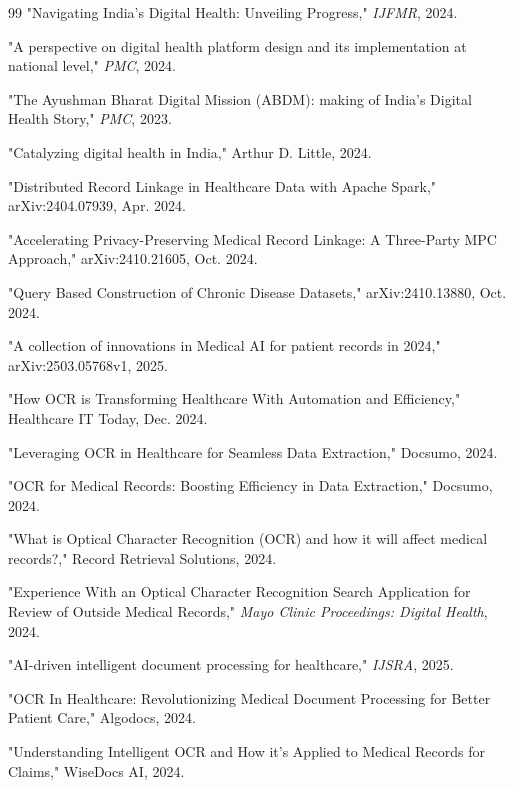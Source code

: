 \documentclass[conference]{IEEEtran}
\begin{document}
\begin{thebibliography}{99}
"Navigating India's Digital Health: Unveiling Progress," \textit{IJFMR}, 2024.

"A perspective on digital health platform design and its implementation at national level," \textit{PMC}, 2024.

"The Ayushman Bharat Digital Mission (ABDM): making of India's Digital Health Story," \textit{PMC}, 2023.

"Catalyzing digital health in India," Arthur D. Little, 2024.

"Distributed Record Linkage in Healthcare Data with Apache Spark," arXiv:2404.07939, Apr. 2024.

"Accelerating Privacy-Preserving Medical Record Linkage: A Three-Party MPC Approach," arXiv:2410.21605, Oct. 2024.

"Query Based Construction of Chronic Disease Datasets," arXiv:2410.13880, Oct. 2024.

"A collection of innovations in Medical AI for patient records in 2024," arXiv:2503.05768v1, 2025.

"How OCR is Transforming Healthcare With Automation and Efficiency," Healthcare IT Today, Dec. 2024.

"Leveraging OCR in Healthcare for Seamless Data Extraction," Docsumo, 2024.

"OCR for Medical Records: Boosting Efficiency in Data Extraction," Docsumo, 2024.

"What is Optical Character Recognition (OCR) and how it will affect medical records?," Record Retrieval Solutions, 2024.

"Experience With an Optical Character Recognition Search Application for Review of Outside Medical Records," \textit{Mayo Clinic Proceedings: Digital Health}, 2024.

"AI-driven intelligent document processing for healthcare," \textit{IJSRA}, 2025.

"OCR In Healthcare: Revolutionizing Medical Document Processing for Better Patient Care," Algodocs, 2024.

"Understanding Intelligent OCR and How it's Applied to Medical Records for Claims," WiseDocs AI, 2024.


\end{thebibliography}
\end{document}
